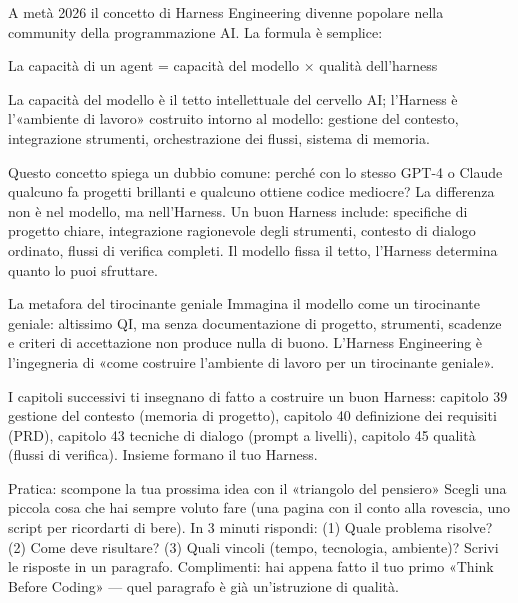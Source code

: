 
A metà 2026 il concetto di Harness Engineering divenne popolare nella community della programmazione AI. La formula è semplice:

La capacità di un agent = capacità del modello × qualità dell'harness

La capacità del modello è il tetto intellettuale del cervello AI; l'Harness è l'«ambiente di lavoro» costruito intorno al modello: gestione del contesto, integrazione strumenti, orchestrazione dei flussi, sistema di memoria.

Questo concetto spiega un dubbio comune: perché con lo stesso GPT-4 o Claude qualcuno fa progetti brillanti e qualcuno ottiene codice mediocre? La differenza non è nel modello, ma nell'Harness. Un buon Harness include: specifiche di progetto chiare, integrazione ragionevole degli strumenti, contesto di dialogo ordinato, flussi di verifica completi. Il modello fissa il tetto, l'Harness determina quanto lo puoi sfruttare.

\begin{tcbinfo}{La metafora del tirocinante geniale}
Immagina il modello come un tirocinante geniale: altissimo QI, ma senza documentazione di progetto, strumenti, scadenze e criteri di accettazione non produce nulla di buono. L'Harness Engineering è l'ingegneria di «come costruire l'ambiente di lavoro per un tirocinante geniale».

\end{tcbinfo}

I capitoli successivi ti insegnano di fatto a costruire un buon Harness: capitolo 39 gestione del contesto (memoria di progetto), capitolo 40 definizione dei requisiti (PRD), capitolo 43 tecniche di dialogo (prompt a livelli), capitolo 45 qualità (flussi di verifica). Insieme formano il tuo Harness.

\begin{tcbpractice}{Pratica: scompone la tua prossima idea con il «triangolo del pensiero»}
Scegli una piccola cosa che hai sempre voluto fare (una pagina con il conto alla rovescia, uno script per ricordarti di bere). In 3 minuti rispondi: (1) Quale problema risolve? (2) Come deve risultare? (3) Quali vincoli (tempo, tecnologia, ambiente)? Scrivi le risposte in un paragrafo. Complimenti: hai appena fatto il tuo primo «Think Before Coding» — quel paragrafo è già un'istruzione di qualità.

\end{tcbpractice}

